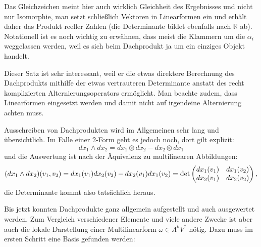 \documentclass[../H_Analysis_main.tex]{subfiles}
\begin{document}
Das Gleichzeichen meint hier auch wirklich Gleichheit des Ergebnisses und nicht nur Isomorphie, man setzt schließlich Vektoren in Linearformen ein und erhält daher das Produkt reeller Zahlen (die Determinante bildet ebenfalls nach $\mathbb{R}$ ab). Notationell ist es noch wichtig zu erwähnen, dass meist die Klammern um die $\alpha_i$ weggelassen werden, weil es sich beim Dachprodukt ja um ein einziges Objekt handelt.

Dieser Satz ist sehr interessant, weil er die etwas direktere Berechnung des Dachprodukts mithilfe der etwas vertrauteren Determinante anstatt des recht komplizierten Alternierungsoperators ermöglicht. Man beachte zudem, dass Linearformen eingesetzt werden und damit nicht auf irgendeine Alternierung achten muss.


\begin{bsp}
Ausschreiben von Dachprodukten wird im Allgemeinen sehr lang und übersichtlich. Im Falle einer 2-Form geht es jedoch noch, dort gilt explizit:
\begin{equation}
dx_1 \wedge dx_2 = dx_1 \otimes dx_2 - dx_2 \otimes dx_1
\end{equation}
und die Auswertung ist nach der Äquivalenz zu multilinearen Abbildungen:
\begin{equation*}
\qty(dx_1 \wedge dx_2)(v_1, v_2) = dx_1(v_1) dx_2(v_2) - dx_2(v_1) dx_1(v_2) = \det\mqty(dx_1(v_1) & dx_1(v_2) \\ dx_2(v_1) & dx_2(v_2)) \, ,
\end{equation*}
die Determinante kommt also tatsächlich heraus.
\end{bsp}

Bis jetzt konnten Dachprodukte ganz allgemein aufgestellt und auch ausgewertet werden. Zum Vergleich verschiedener Elemente und viele andere Zwecke ist aber auch die lokale Darstellung einer Multilinearform $\omega \in \Lambda^k V^*$ nötig. Dazu muss im ersten Schritt eine Basis gefunden werden:
\end{document}
